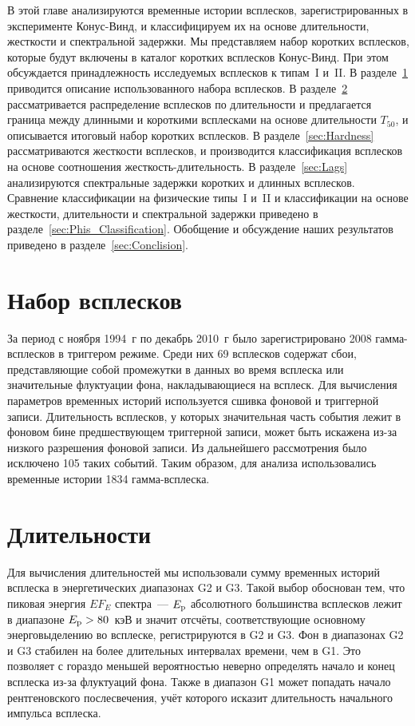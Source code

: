 В этой главе анализируются временные истории всплесков, зарегистрированных в 
эксперименте Конус-Винд, и классифицируем их на основе длительности, жесткости и 
спектральной задержки. Мы представляем набор коротких всплесков, которые будут 
включены в каталог коротких всплесков Конус-Винд. При этом обсуждается принадлежность 
исследуемых всплесков к типам~I и~II. В разделе~\ref{sec:GRB_sample} приводится 
описание использованного набора всплесков. 
В разделе~\ref{sec:Durations} рассматривается распределение всплесков по длительности 
и предлагается граница между длинными и короткими всплесками на основе 
длительности $T_{50}$, и описывается итоговый набор коротких всплесков. 
В разделе~\ref{sec:Hardness} рассматриваются жесткости всплесков, и производится 
классификация всплесков на основе соотношения жесткость-длительность. 
В разделе~\ref{sec:Lags} анализируются спектральные задержки коротких и длинных всплесков. 
Сравнение классификации на физические типы~I и~II и классификации на основе жесткости, 
длительности и спектральной задержки приведено в разделе~\ref{sec:Phis_Classification}. 
Обобщение и обсуждение наших результатов приведено в разделе~\ref{sec:Conclision}.  

\section{Набор всплесков}\label{sec:GRB_sample}
За период с ноября 1994~г по декабрь 2010~г было зарегистрировано 2008 гамма-всплесков 
в триггером режиме. Среди них 69 всплесков содержат сбои, представляющие собой 
промежутки в данных во время всплеска или значительные флуктуации фона, 
накладывающиеся на всплеск. Для вычисления параметров временных историй используется 
сшивка фоновой и триггерной записи. Длительность всплесков, у которых значительная 
часть события лежит в фоновом бине предшествующем триггерной записи, может быть 
искажена из-за низкого разрешения фоновой записи. Из дальнейшего рассмотрения 
было исключено 105 таких событий. Таким образом, для анализа использовались временные 
истории 1834 гамма-всплеска. 

\section{Длительности}\label{sec:Durations}
Для вычисления длительностей мы использовали сумму временных историй всплеска 
в энергетических диапазонах G2 и G3. Такой выбор обоснован тем, что  пиковая 
энергия $E F_{E}$ спектра~--- $E_{{\mathrm{p}}}$ абсолютного большинства всплесков лежит в 
диапазоне $E_{{\mathrm{p}}}>80$~кэВ и значит отсчёты, соответствующие  основному энерговыделению 
во всплеске, регистрируются в G2 и G3. Фон в диапазонах G2 и G3 стабилен на более 
длительных интервалах времени, чем в G1. Это позволяет с гораздо меньшей вероятностью 
неверно определять начало и конец всплеска из-за флуктуаций фона. Также в диапазон G1 
может попадать начало рентгеновского послесвечения, учёт которого исказит 
длительность начального импульса всплеска.

